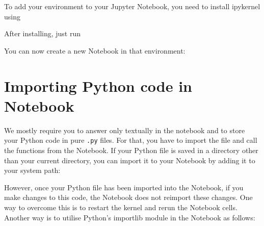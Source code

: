 \documentclass[a4paper,10pt]{article}
\begin{document}
To add your environment to your Jupyter Notebook, you need to install ipykernel using
\begin{center}
\end{center}

After installing, just run
\begin{center}
\end{center}

You can now create a new Notebook in that environment:

\begin{center}
\end{center}

\section{Importing Python code in Notebook}

We mostly require you to answer only textually in the notebook and to store your Python code in pure \texttt{.py} files. For that, you have to import the file and call the functions from the Notebook.
If your Python file is saved in a directory other than your current directory, you can import it to your Notebook by adding it to your system path:

\begin{center}
\end{center}

However, once your Python file has been imported into the Notebook, if you make changes to this code, the Notebook does not reimport these changes. One way to overcome this is to restart the kernel and rerun the Notebook cells. Another way is to utilise Python's importlib module in the Notebook as follows:
\end{document}
